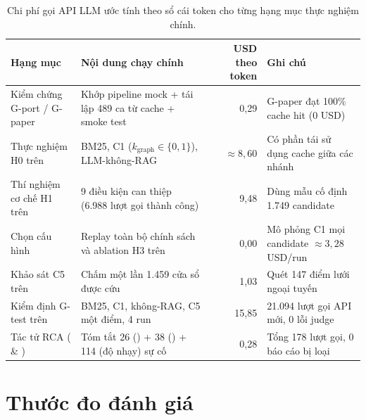 \begin{table}[htbp]
  \centering
  \caption[Tổng hợp chi phí gọi API LLM theo các hạng mục thực nghiệm]{Chi phí gọi API LLM ước tính theo sổ cái token cho từng hạng mục thực nghiệm chính.}
  \label{tab:ch5-costs}
  \scriptsize
  \renewcommand{\arraystretch}{1.15}
  \begin{tabularx}{\linewidth}{@{}l Y r Y@{}}
    \toprule
    \textbf{Hạng mục} & \textbf{Nội dung chạy chính} & \textbf{USD theo token} & \textbf{Ghi chú} \\
    \midrule
    Kiểm chứng G-port / G-paper & Khớp pipeline mock + tái lập 489 ca từ cache + smoke test & 0,29 & G-paper đạt 100\% cache hit (0 USD) \\
    Thực nghiệm H0 trên  & BM25, C1 ($k_{\text{graph}} \in \{0, 1\}$), LLM-không-RAG & $\approx 8{,}60$ & Có phần tái sử dụng cache giữa các nhánh \\
    Thí nghiệm cơ chế H1 trên  & 9 điều kiện can thiệp (6.988 lượt gọi thành công) & 9,48 & Dùng mẫu cố định 1.749 candidate \\
    Chọn cấu hình \CTAV{} & Replay toàn bộ chính sách và ablation H3 trên  & 0,00 & Mô phỏng C1 mọi candidate $\approx 3{,}28$ USD/run \\
    Khảo sát C5 trên  & Chấm một lần 1.459 cửa sổ được cứu & 1,03 & Quét 147 điểm lưới ngoại tuyến \\
    Kiểm định G-test trên  & BM25, C1, không-RAG, C5 một điểm, 4 run  & 15,85 & 21.094 lượt gọi API mới, 0 lỗi judge \\
    Tác tử RCA ( \& ) & Tóm tắt 26 () + 38 () + 114 (độ nhạy) sự cố & 0,28 & Tổng 178 lượt gọi, 0 báo cáo bị loại \\
    \bottomrule
  \end{tabularx}
\end{table}

\section{Thước đo đánh giá}
\label{sec:ch5-metrics}

